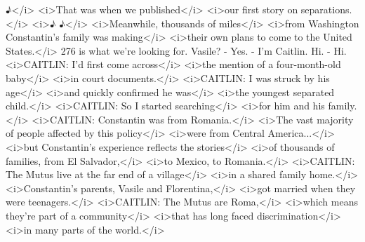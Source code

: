 \begin{itemize}
  ♪\textless{}/i\textgreater{} \textless{}i\textgreater{}That was when
  we published\textless{}/i\textgreater{} \textless{}i\textgreater{}our
  first story on separations.\textless{}/i\textgreater{}
  \textless{}i\textgreater{}♪ ♪\textless{}/i\textgreater{}
  \textless{}i\textgreater{}Meanwhile, thousands of
  miles\textless{}/i\textgreater{} \textless{}i\textgreater{}from
  Washington Constantin's family was making\textless{}/i\textgreater{}
  \textless{}i\textgreater{}their own plans to come to the United
  States.\textless{}/i\textgreater{} 276 is what we're looking for.
  Vasile? - Yes. - I'm Caitlin. Hi. - Hi.
  \textless{}i\textgreater{}CAITLIN: I'd first come
  across\textless{}/i\textgreater{} \textless{}i\textgreater{}the
  mention of a four-month-old baby\textless{}/i\textgreater{}
  \textless{}i\textgreater{}in court
  documents.\textless{}/i\textgreater{}
  \textless{}i\textgreater{}CAITLIN: I was struck by his
  age\textless{}/i\textgreater{} \textless{}i\textgreater{}and quickly
  confirmed he was\textless{}/i\textgreater{}
  \textless{}i\textgreater{}the youngest separated
  child.\textless{}/i\textgreater{} \textless{}i\textgreater{}CAITLIN:
  So I started searching\textless{}/i\textgreater{}
  \textless{}i\textgreater{}for him and his
  family.\textless{}/i\textgreater{} \textless{}i\textgreater{}CAITLIN:
  Constantin was from Romania.\textless{}/i\textgreater{}
  \textless{}i\textgreater{}The vast majority of people affected by this
  policy\textless{}/i\textgreater{} \textless{}i\textgreater{}were from
  Central America...\textless{}/i\textgreater{}
  \textless{}i\textgreater{}but Constantin's experience reflects the
  stories\textless{}/i\textgreater{} \textless{}i\textgreater{}of
  thousands of families, from El Salvador,\textless{}/i\textgreater{}
  \textless{}i\textgreater{}to Mexico, to
  Romania.\textless{}/i\textgreater{} \textless{}i\textgreater{}CAITLIN:
  The Mutus live at the far end of a village\textless{}/i\textgreater{}
  \textless{}i\textgreater{}in a shared family
  home.\textless{}/i\textgreater{}
  \textless{}i\textgreater{}Constantin's parents, Vasile and
  Florentina,\textless{}/i\textgreater{} \textless{}i\textgreater{}got
  married when they were teenagers.\textless{}/i\textgreater{}
  \textless{}i\textgreater{}CAITLIN: The Mutus are
  Roma,\textless{}/i\textgreater{} \textless{}i\textgreater{}which means
  they're part of a community\textless{}/i\textgreater{}
  \textless{}i\textgreater{}that has long faced
  discrimination\textless{}/i\textgreater{} \textless{}i\textgreater{}in
  many parts of the world.\textless{}/i\textgreater{}

\end{itemize}
